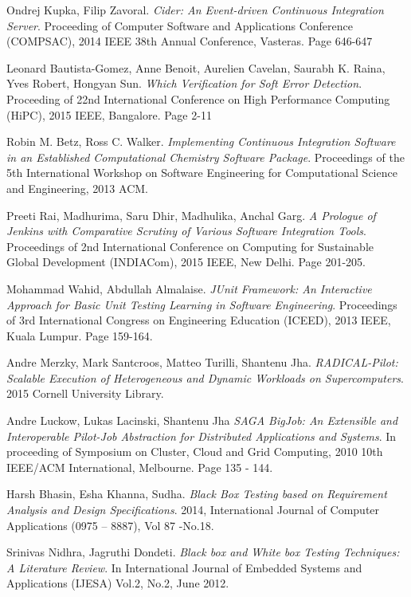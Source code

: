 \documentclass[10pt]{ruthesis}
\begin{document}
\begin{thebibliography}{30}
Ondrej Kupka, Filip Zavoral.
\textit{Cider: An Event-driven Continuous Integration Server}.
Proceeding of Computer Software and Applications Conference (COMPSAC), 2014 IEEE 38th Annual Conference, Vasteras. 
Page 646-647

Leonard Bautista-Gomez, Anne Benoit, Aurelien Cavelan, Saurabh K. Raina, Yves Robert, Hongyan Sun.
\textit{Which Verification for Soft Error Detection}.
Proceeding of 22nd International Conference on High Performance Computing (HiPC), 2015 IEEE, Bangalore. Page 2-11

Robin M. Betz, Ross C. Walker.
\textit{Implementing Continuous Integration Software in an Established Computational Chemistry Software Package}.
Proceedings of the 5th International Workshop on Software Engineering for Computational Science and Engineering, 2013 ACM.

Preeti Rai, Madhurima, Saru Dhir, Madhulika, Anchal Garg.
\textit{A Prologue of Jenkins with Comparative Scrutiny of Various Software Integration Tools}.
Proceedings of 2nd International Conference on Computing for Sustainable Global Development (INDIACom), 2015 IEEE, New Delhi. Page 201-205.

Mohammad Wahid, Abdullah Almalaise.
\textit{JUnit Framework: An Interactive Approach for Basic Unit Testing Learning in Software Engineering}.
Proceedings of 3rd International Congress on Engineering Education (ICEED), 2013 IEEE, Kuala Lumpur. Page 159-164.

Andre Merzky, Mark Santcroos, Matteo Turilli, Shantenu Jha.
\textit{RADICAL-Pilot: Scalable Execution of Heterogeneous and Dynamic Workloads on
Supercomputers}.
2015 Cornell University Library.

Andre Luckow, Lukas Lacinski, Shantenu Jha 
\textit{SAGA BigJob: An Extensible and Interoperable Pilot-Job Abstraction for Distributed Applications and Systems}.
In proceeding of Symposium on Cluster, Cloud and Grid Computing, 2010 10th IEEE/ACM International, Melbourne. Page 135 - 144.

Harsh Bhasin, Esha Khanna, Sudha.
\textit{Black Box Testing based on Requirement Analysis and Design Specifications}.
2014, International Journal of Computer Applications (0975 – 8887), Vol 87 -No.18.

Srinivas Nidhra, Jagruthi Dondeti.
\textit{Black box and White box Testing Techniques: A Literature Review}.
In International Journal of Embedded Systems and Applications (IJESA) Vol.2, No.2, June 2012.


\end{thebibliography}
\end{document}

